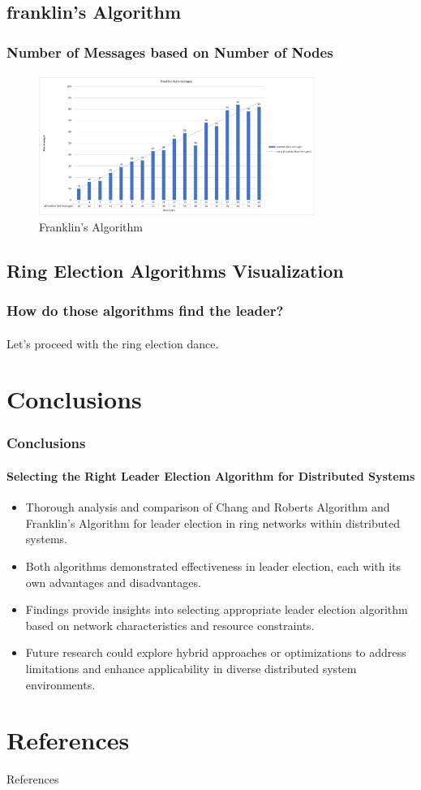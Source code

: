 \documentclass[11pt]{beamer}              %
\begin{document}
\subsection{franklin's Algorithm}
\begin{frame}
\frametitle{Number of Messages based on Number of Nodes}
\framesubtitle{}

\begin{figure}
    \centering
    \includegraphics[width=0.8\textwidth]{figures/franklins_graph.png}
    \caption{Franklin's Algorithm}
\end{figure}
\end{frame}

\subsection{Ring Election Algorithms Visualization}
\begin{frame}
\frametitle{How do those algorithms find the leader?}
\framesubtitle{}
Let's proceed with the ring election dance.
\end{frame}

\section{Conclusions}
\begin{frame}
\frametitle{Conclusions}
\framesubtitle{Selecting the Right Leader Election Algorithm for Distributed Systems}
\begin{itemize}
    \item Thorough analysis and comparison of Chang and Roberts Algorithm and Franklin’s Algorithm for leader election in ring networks within distributed systems.
    \item Both algorithms demonstrated effectiveness in leader election, each with its own advantages and disadvantages.
    \item Findings provide insights into selecting appropriate leader election algorithm based on network characteristics and resource constraints.
    \item Future research could explore hybrid approaches or optimizations to address limitations and enhance applicability in diverse distributed system environments.
\end{itemize}

\end{frame}

\section*{References}
\begin{frame}{References}


\nocite{*} %
\end{frame}


\thankslide
\end{document}
